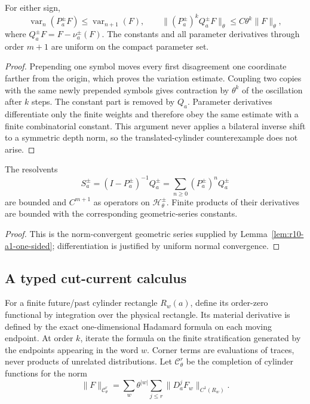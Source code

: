 \begin{lemma}
\label{lem:r10-a1-one-sided}
For either sign,
\[
 \operatorname{var}_n(P_a^\pm F)
 \le \operatorname{var}_{n+1}(F),
 \qquad
 \|(P_a^\pm)^kQ_a^\pm F\|_\theta
 \le C\theta^k\|F\|_\theta,
\]
where \(Q_a^\pm F=F-\nu_a^\pm(F)\).  The constants and all parameter
derivatives through order \(m+1\) are uniform on the compact parameter set.
\end{lemma}

\begin{proof}
Prepending one symbol moves every first disagreement one coordinate farther
from the origin, which proves the variation estimate.  Coupling two copies
with the same newly prepended symbols gives contraction by \(\theta^k\) of
the oscillation after \(k\) steps.  The constant part is removed by \(Q_a\).
Parameter derivatives differentiate only the finite weights and therefore
obey the same estimate with a finite combinatorial constant.  This argument
never applies a bilateral inverse shift to a symmetric depth norm, so the
translated-cylinder counterexample does not arise.
\end{proof}

\begin{corollary}
\label{cor:r10-a1-resolvent}
The resolvents
\[
 S_a^\pm=(I-P_a^\pm)^{-1}Q_a^\pm
 =\sum_{n\ge0}(P_a^\pm)^nQ_a^\pm
\]
are bounded and \(C^{m+1}\) as operators on
\(\mathscr H_\theta^\pm\).  Finite products of their derivatives are bounded
with the corresponding geometric-series constants.
\end{corollary}

\begin{proof}
This is the norm-convergent geometric series supplied by
Lemma~\ref{lem:r10-a1-one-sided}; differentiation is justified by uniform
normal convergence.
\end{proof}

\subsection{A typed cut-current calculus}

For a finite future/past cylinder rectangle \(R_w(a)\), define its order-zero
functional by integration over the physical rectangle.  Its material
derivative is defined by the exact one-dimensional Hadamard formula on each
moving endpoint.  At order \(k\), iterate the formula on the finite
stratification generated by the endpoints appearing in the word \(w\).
Corner terms are evaluations of traces, never products of unrelated
distributions.  Let \(\mathscr C_{\theta}^{r}\) be the completion of cylinder
functions for the norm
\[
 \|F\|_{\mathscr C_\theta^r}
 =\sum_w\theta^{|w|}
 \sum_{j\le r}\|D_a^jF_w\|_{C^1(R_w)}.
\]

